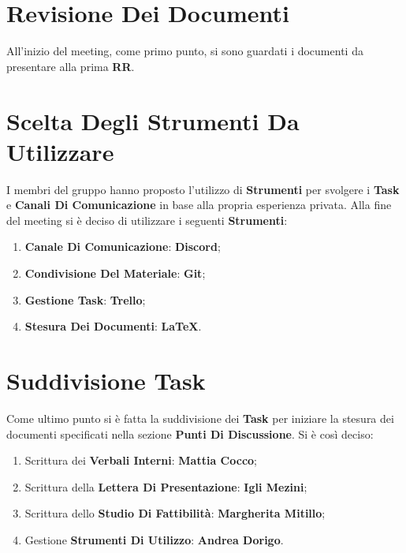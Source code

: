 	\section{Revisione Dei Documenti}
	All'inizio del meeting, come primo punto, si sono guardati i documenti da presentare alla prima \textbf{RR}.
	
	\section{Scelta Degli Strumenti Da Utilizzare}
	I membri del gruppo hanno proposto l'utilizzo di \textbf{Strumenti} per svolgere i \textbf{Task} e \textbf{Canali Di Comunicazione} in base alla propria esperienza privata.
	Alla fine del meeting si è deciso di utilizzare i seguenti \textbf{Strumenti}:
	\begin{enumerate}
		\item \textbf{Canale Di Comunicazione}: \textbf{Discord};
		\item \textbf{Condivisione Del Materiale}: \textbf{Git};
		\item \textbf{Gestione Task}: \textbf{Trello};
		\item \textbf{Stesura Dei Documenti}: \textbf{LaTeX}.
	\end{enumerate}
	 
	\section{Suddivisione Task}
	Come ultimo punto si è fatta la suddivisione dei \textbf{Task} per iniziare la stesura dei documenti specificati nella sezione \textbf{Punti Di Discussione}.
	Si è così deciso:
	\begin{enumerate}
		\item Scrittura dei \textbf{Verbali Interni}: \textbf{Mattia Cocco};
		\item Scrittura della \textbf{Lettera Di Presentazione}: \textbf{Igli Mezini};
		\item Scrittura dello \textbf{Studio Di Fattibilità}: \textbf{Margherita Mitillo};
		\item Gestione \textbf{Strumenti Di Utilizzo}: \textbf{Andrea Dorigo}.
	\end{enumerate}